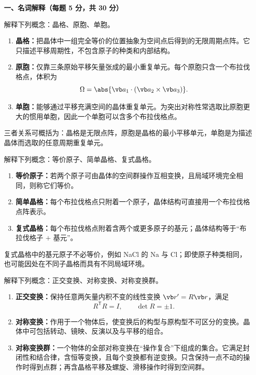 
\textbf{一、名词解释（每题 5 分，共 30 分）}

\begin{question}[5 分]
解释下列概念：晶格、原胞、单胞。


\begin{solution}
\begin{enumerate}
  \item \textbf{晶格：}把晶体中一组完全等价的位置抽象为空间点后得到的无限周期点阵。它只描述平移周期性，不包含原子的种类和内部结构。
  \item \textbf{原胞：}仅靠三条原始平移矢量张成的最小重复单元。每个原胞只含一个布拉伐格点，体积为
  \[
    \Omega=\abs{\vb a_1\cdot(\vb a_2\times\vb a_3)}.
  \]
  \item \textbf{单胞：}能够通过平移充满空间的晶体重复单元。为突出对称性常选取比原胞更大的惯用单胞，因此一个单胞可以含多个布拉伐格点。
\end{enumerate}
三者关系可概括为：晶格是无限点阵，原胞是晶格的最小平移单元，单胞是为描述晶体而选取的任意周期重复单元。
\end{solution}
\end{question}

\begin{question}[5 分]
解释下列概念：等价原子、简单晶格、复式晶格。


\begin{solution}
\begin{enumerate}
  \item \textbf{等价原子：}若两个原子可由晶体的空间群操作互相变换，且局域环境完全相同，则称它们等价。
  \item \textbf{简单晶格：}每个布拉伐格点只附着一个原子，晶体结构可直接用一个布拉伐格点阵表示。
  \item \textbf{复式晶格：}每个布拉伐格点附着含两个或更多原子的基元；晶体结构等于“布拉伐格子 $+$ 基元”。
\end{enumerate}
复式晶格中的基元原子不必等价，例如 NaCl 的 Na 与 Cl；即使原子种类相同，也可能因处在不同子晶格而具有不同局域环境。
\end{solution}
\end{question}

\begin{question}[5 分]
解释下列概念：正交变换、对称变换、对称变换群。


\begin{solution}
\begin{enumerate}
  \item \textbf{正交变换：}保持任意两矢量内积不变的线性变换 $\vb r'=R\vb r$，满足
  \[
    R^{\mathsf T}R=I,\qquad \det R=\pm1.
  \]
  \item \textbf{对称变换：}作用于一个物体后，使变换后的构型与原构型不可区分的变换。晶体中可包括转动、镜映、反演以及与平移的组合。
  \item \textbf{对称变换群：}一个物体的全部对称变换在“操作复合”下组成的集合。它满足封闭性和结合律，含恒等变换，且每个变换都有逆变换。只含保持一点不动的操作时得到点群；再含晶格平移及螺旋、滑移操作时得到空间群。
\end{enumerate}
\end{solution}
\end{question}

